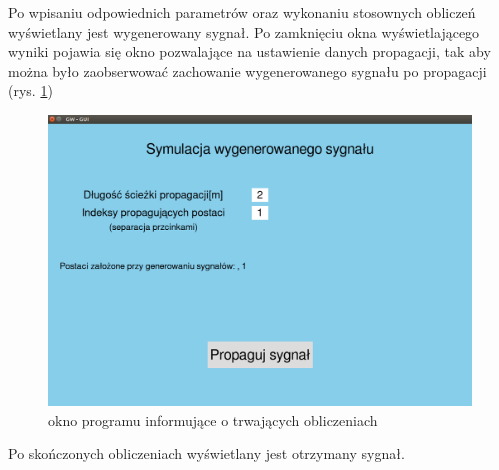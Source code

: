 Po wpisaniu odpowiednich parametrów oraz wykonaniu stosownych obliczeń wyświetlany jest wygenerowany sygnał. Po zamknięciu okna wyświetlającego wyniki pojawia się  okno pozwalające na ustawienie danych propagacji, tak aby można było zaobserwować zachowanie wygenerowanego sygnału po propagacji (rys. \ref{fig:guiLast2})

\begin{figure}[h]
\centering
\includegraphics[width=13cm]{Zdjecia/5/kasia/guiLast2}
\caption{okno programu informujące o trwających obliczeniach}
\label{fig:guiLast2}
\end{figure}

Po skończonych obliczeniach wyświetlany jest otrzymany sygnał.
